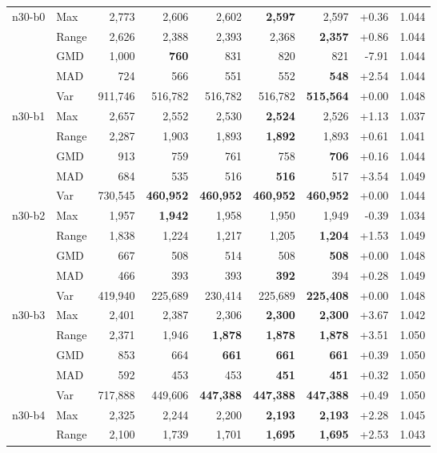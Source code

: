 \begin{small}
\begin{longtable}{llrrrrrrr}
n30-b0 & Max & 2,773 & 2,606 & 2,602 & \textbf{2,597} & 2,597 & +0.36 & 1.044 \\
 & Range & 2,626 & 2,388 & 2,393 & 2,368 & \textbf{2,357} & +0.86 & 1.044 \\
 & GMD & 1,000 & \textbf{760} & 831 & 820 & 821 & -7.91 & 1.044 \\
 & MAD & 724 & 566 & 551 & 552 & \textbf{548} & +2.54 & 1.044 \\
 & Var & 911,746 & 516,782 & 516,782 & 516,782 & \textbf{515,564} & +0.00 & 1.048 \\
n30-b1 & Max & 2,657 & 2,552 & 2,530 & \textbf{2,524} & 2,526 & +1.13 & 1.037 \\
 & Range & 2,287 & 1,903 & 1,893 & \textbf{1,892} & 1,893 & +0.61 & 1.041 \\
 & GMD & 913 & 759 & 761 & 758 & \textbf{706} & +0.16 & 1.044 \\
 & MAD & 684 & 535 & 516 & \textbf{516} & 517 & +3.54 & 1.049 \\
 & Var & 730,545 & \textbf{460,952} & \textbf{460,952} & \textbf{460,952} & \textbf{460,952} & +0.00 & 1.044 \\
n30-b2 & Max & 1,957 & \textbf{1,942} & 1,958 & 1,950 & 1,949 & -0.39 & 1.034 \\
 & Range & 1,838 & 1,224 & 1,217 & 1,205 & \textbf{1,204} & +1.53 & 1.049 \\
 & GMD & 667 & 508 & 514 & 508 & \textbf{508} & +0.00 & 1.048 \\
 & MAD & 466 & 393 & 393 & \textbf{392} & 394 & +0.28 & 1.049 \\
 & Var & 419,940 & 225,689 & 230,414 & 225,689 & \textbf{225,408} & +0.00 & 1.048 \\
n30-b3 & Max & 2,401 & 2,387 & 2,306 & \textbf{2,300} & \textbf{2,300} & +3.67 & 1.042 \\
 & Range & 2,371 & 1,946 & \textbf{1,878} & \textbf{1,878} & \textbf{1,878} & +3.51 & 1.050 \\
 & GMD & 853 & 664 & \textbf{661} & \textbf{661} & \textbf{661} & +0.39 & 1.050 \\
 & MAD & 592 & 453 & 453 & \textbf{451} & \textbf{451} & +0.32 & 1.050 \\
 & Var & 717,888 & 449,606 & \textbf{447,388} & \textbf{447,388} & \textbf{447,388} & +0.49 & 1.050 \\
n30-b4 & Max & 2,325 & 2,244 & 2,200 & \textbf{2,193} & \textbf{2,193} & +2.28 & 1.045 \\
 & Range & 2,100 & 1,739 & 1,701 & \textbf{1,695} & \textbf{1,695} & +2.53 & 1.043 \\

\end{longtable}
\end{small}

